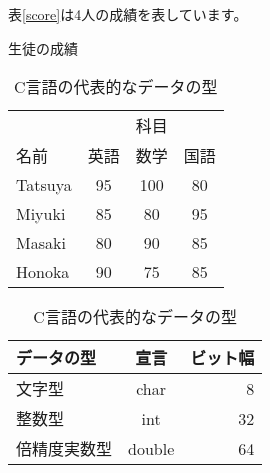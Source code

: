 \documentclass[11pt]{jsarticle}
\begin{document}
表\ref{score}は4人の成績を表しています。

\begin{table}[htbp]
  \begin{minipage}[t]{0.45\hsize}
    \caption{生徒の成績}
    \label{score}
    \centering
    \begin{tabular}{l||ccc}
      \hline
              & \multicolumn{3}{c}{科目}               \\
      名前    & 英語                     & 数学 & 国語 \\ \hline\hline
      Tatsuya & 95                       & 100  & 80   \\ \hline
      Miyuki  & 85                       & 80   & 95   \\ \hline
      Masaki  & 80                       & 90   & 85   \\ \hline
      Honoka  & 90                       & 75   & 85   \\ \hline
    \end{tabular}
  \end{minipage}
  \begin{minipage}[t]{0.45\hsize}
    \caption{C言語の代表的なデータの型}
    \label{c_data_type}
    \centering
    \begin{tabular}{lcr}
      \toprule
      データの型   & 宣言   & ビット幅 \\
      \midrule
      文字型       & char   & 8        \\
      整数型       & int    & 32       \\
      倍精度実数型 & double & 64       \\
      \bottomrule
    \end{tabular}
  \end{minipage}
\end{table}
\end{document}
